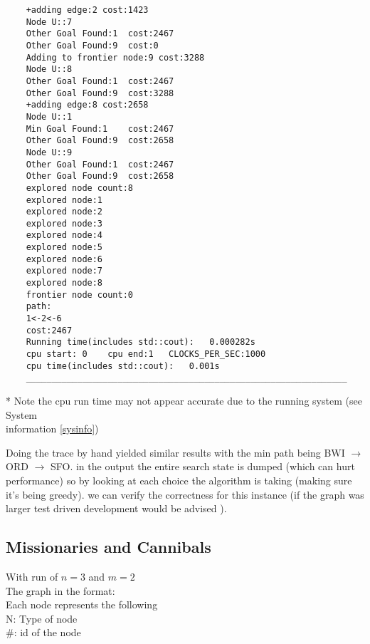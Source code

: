 \documentclass[12pt]{article}
\begin{document}
\begin{lstlisting}
	+adding edge:2 cost:1423
	Node U::7
	Other Goal Found:1	cost:2467
	Other Goal Found:9	cost:0
	Adding to frontier node:9 cost:3288
	Node U::8
	Other Goal Found:1	cost:2467
	Other Goal Found:9	cost:3288
	+adding edge:8 cost:2658
	Node U::1
	Min Goal Found:1	cost:2467
	Other Goal Found:9	cost:2658
	Node U::9
	Other Goal Found:1	cost:2467
	Other Goal Found:9	cost:2658
	explored node count:8
	explored node:1
	explored node:2
	explored node:3
	explored node:4
	explored node:5
	explored node:6
	explored node:7
	explored node:8
	frontier node count:0
	path:
	1<-2<-6
	cost:2467
	Running time(includes std::cout):	0.000282s
	cpu start: 0	cpu end:1	CLOCKS_PER_SEC:1000
	cpu time(includes std::cout):	0.001s
	_______________________________________________________________

\end{lstlisting}
* Note the cpu run time may not appear accurate due to the running system (see System \\ information \ref{sysinfo})

Doing the trace by hand yielded similar results with the min path being BWI $\to$ ORD  $\to$ SFO. in the output 
the entire search state is dumped (which can hurt performance) so by looking at each choice the algorithm is taking (making sure it's being greedy).
we can verify the correctness for this instance (if the graph was larger test driven development would be advised ). 

\subsection{Missionaries and Cannibals}
With run of $n=3$ and $m=2$ \\
The graph in the format:\\
Each node represents the following\\

N: Type of node\\

\#: id of the node\\
\end{document}
